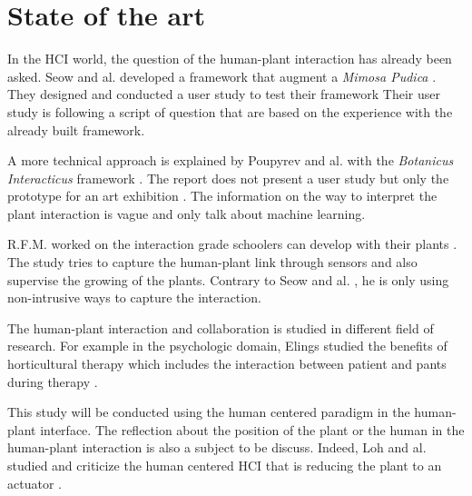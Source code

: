\section{State of the art}

In the HCI world, the question of the human-plant interaction has already been asked. 
Seow and al. developed a framework that augment a \textit{Mimosa Pudica} \cite{seowPudicaFrameworkDesigning2022}. They designed and conducted a user study to test their framework
Their user study is following a script of question that are based on the experience with the already built framework.

A more technical approach is explained by Poupyrev and al. with the \textit{Botanicus Interacticus} framework \cite{poupyrev2012botanicus}.
The report does not present a user study but only the prototype for an art exhibition \cite{kasik2012hands}.
The information on the way to interpret the plant interaction is vague and only talk about machine learning.
 

R.F.M. worked on the interaction grade schoolers can develop with their plants \cite{ledo2019music}. 
The study tries to capture the human-plant link through sensors and also supervise the growing of the plants.
Contrary to Seow and al. \cite{seowPudicaFrameworkDesigning2022}, he is only using non-intrusive ways to capture the interaction.

The human-plant interaction and collaboration is studied in different field of research. 
For example in the psychologic domain, Elings studied the benefits of horticultural therapy which includes the interaction between patient and pants during therapy \cite{elings2006people}.

This study will be conducted using the human centered paradigm in the human-plant interface.
The reflection about the position of the plant or the human in the human-plant interaction is also a subject to be discuss.
Indeed, Loh and al. studied and criticize the human centered HCI that is reducing the plant to an actuator \cite{lohMorethanhumanTurnHumanplant2024}.